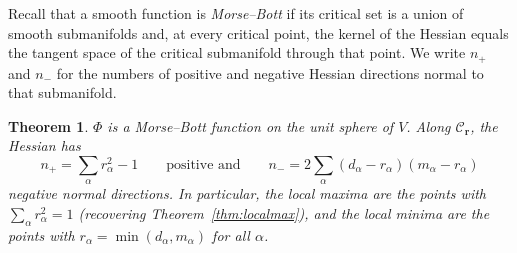 \documentclass{amsart}
\newtheorem{theorem}{Theorem}
\theoremstyle{remark}
\begin{document}
Recall that a smooth function is \emph{Morse--Bott} if its critical set is a union of smooth
submanifolds and, at every critical point, the kernel of the Hessian equals the tangent space of the
critical submanifold through that point. We write $n_+$ and $n_-$ for the numbers of positive and
negative Hessian directions normal to that submanifold.
 
\begin{theorem}\label{thm:morse}
$\Phi$ is a Morse--Bott function on the unit sphere of $V$. Along $\mathcal C_{\mathbf r}$, the Hessian has
\[
 n_+=\sum_\alpha r_\alpha^2-1
 \qquad\text{positive and}\qquad
 n_-=2\sum_\alpha(d_\alpha-r_\alpha)(m_\alpha-r_\alpha)
\]
negative normal directions. In particular, the local maxima are the points with
$\sum_\alpha r_\alpha^2=1$ (recovering Theorem~\ref{thm:localmax}), and the local minima are the
points with $r_\alpha=\min(d_\alpha,m_\alpha)$ for all $\alpha$.
\end{theorem}
 
\end{document}
